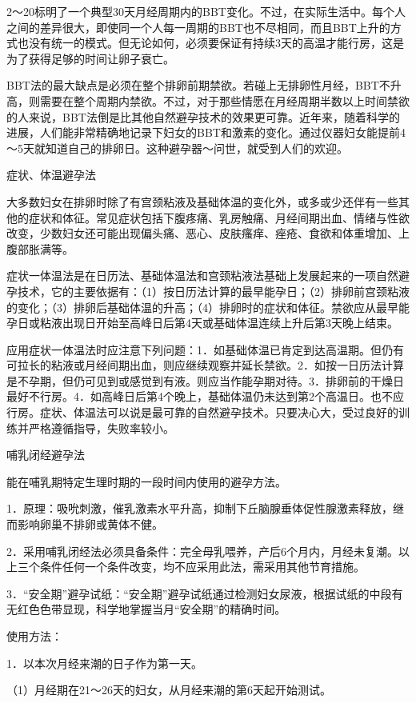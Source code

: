 \documentclass[12pt,UTF8]{ctexbook}
\begin{document}
2～20标明了一个典型30天月经周期内的BBT变化。不过，在实际生活中。每个人之间的差异很大，即使同一个人每一周期的BBT也不尽相同，而且BBT上升的方式也没有统一的模式。但无论如何，必须要保证有持续3天的高温才能行房，这是为了获得足够的时间让卵子衰亡。

BBT法的最大缺点是必须在整个排卵前期禁欲。若碰上无排卵性月经，BBT不升高，则需要在整个周期内禁欲。不过，对于那些情愿在月经周期半数以上时间禁欲的人来说，BBT法倒是比其他自然避孕技术的效果更可靠。近年来，随着科学的进展，人们能非常精确地记录下妇女的BBT和激素的变化。通过仪器妇女能提前4～5天就知道自己的排卵日。这种避孕器～问世，就受到人们的欢迎。

症状、体温避孕法

大多数妇女在排卵时除了有宫颈粘液及基础体温的变化外，或多或少还伴有一些其他的症状和体征。常见症状包括下腹疼痛、乳房触痛、月经间期出血、情绪与性欲改变，少数妇女还可能出现偏头痛、恶心、皮肤瘙痒、痤疮、食欲和体重增加、上腹部胀满等。

症状一体温法是在日历法、基础体温法和宫颈粘液法基础上发展起来的一项自然避孕技术，它的主要依据有：（1）按日历法计算的最早能孕日；（2）排卵前宫颈粘液的变化；（3）排卵后基础体温的升高；（4）排卵时的症状和体征。禁欲应从最早能孕日或粘液出现日开始至高峰日后第4天或基础体温连续上升后第3天晚上结束。

应用症状一体温法时应注意下列问题：1．如基础体温已肯定到达高温期。但仍有可拉长的粘液或月经间期出血，则应继续观察并延长禁欲。2．如按一日历法计算是不孕期，但仍可见到或感觉到有液。则应当作能孕期对待。3．排卵前的干燥日最好不行房。4．如高峰日后第4个晚上，基础体温仍未达到第2个高温日。也不应行房。症状、体温法可以说是最可靠的自然避孕技术。只要决心大，受过良好的训练并严格遵循指导，失败率较小。





哺乳闭经避孕法


能在哺乳期特定生理时期的一段时间内使用的避孕方法。

1．原理：吸吮刺激，催乳激素水平升高，抑制下丘脑腺垂体促性腺激素释放，继而影响卵巢不排卵或黄体不健。

2．采用哺乳闭经法必须具备条件：完全母乳喂养，产后6个月内，月经未复潮。以上三个条件任何一个条件改变，均不应采用此法，需采用其他节育措施。

3．“安全期”避孕试纸：“安全期”避孕试纸通过检测妇女尿液，根据试纸的中段有无红色色带显现，科学地掌握当月“安全期”的精确时间。

使用方法：

1．以本次月经来潮的日子作为第一天。

（1）月经期在21～26天的妇女，从月经来潮的第6天起开始测试。
\end{document}
